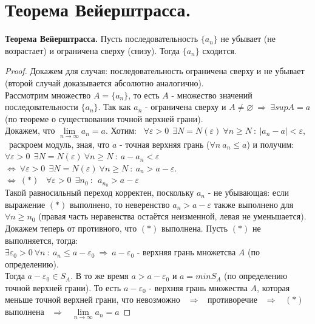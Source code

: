 \documentclass[12pt]{article}
\begin{document}
\section{Теорема Вейерштрасса.}
\textbf{Теорема Вейерштрасса.} Пусть последовательность $\{a_n\}$ не убывает (не возрастает) и ограничена сверху (снизу). Тогда $\{a_n\}$ сходится.
\begin{proof}
    Докажем для случая: последовательность ограничена сверху и не убывает (второй случай доказывается абсолютно аналогично). \\
    Рассмотрим множество $A = \{a_n\}$, то есть $A$ - множество значений последовательности $\{a_n\}$. Так как $a_n$ - ограничена сверху и $A \neq \varnothing \ \Rightarrow \ \exists sup A = a$ (по теореме о существовании точной верхней грани). \\
    Докажем, что $\lim \limits_{n \to \infty} a_n = a$. Хотим: \ 
    $\forall \varepsilon > 0 \ \ \exists N = N(\varepsilon) \ \forall n \geq N\ : \ |a_n - a| < \varepsilon$, \ раскроем модуль, зная, что $a$ - точная верхняя грань ($\forall n \ a_n \leq a$) и получим: \\
    $\forall \varepsilon > 0 \ \ \exists N = N(\varepsilon) \ \forall n \geq N\ : \ a - a_n < \varepsilon$ \  
    $\Leftrightarrow \ \forall \varepsilon > 0 \ \ \exists N = N(\varepsilon) \ \forall n \geq N\ : \ a_n > a - \varepsilon$. \\ 
    $\Leftrightarrow \  (*)$ \ $\forall \varepsilon > 0 \ \ \exists n_0 \ : \ \  a_{n_0} > a - \varepsilon$ \  \\
    Такой равносильный переход корректен, поскольку $a_n$ - не убывающая: если выражение $(*)$ выполнено, то неверенство $a_n > a - \varepsilon$ также выполнено для $\forall n \geq n_0$ (правая часть неравенства остаётся неизменной, левая не уменьшается). \\
    Докажем теперь от противного, что $(*)$ выполнена. Пусть $(*)$ не выполняется, тогда: \\ $\exists \varepsilon_0 > 0 \ \forall n \ : \ a_n \leq a - \varepsilon_0 \ \Rightarrow \ a - \varepsilon_0$ - верхняя грань множетсва $A$ (по определению). \\
    Тогда $a - \varepsilon_0 \in S_A$. В то же время $a > a - \varepsilon_0$ и $a = min S_A$ (по определению точной верхней грани). То есть $a - \varepsilon_0$ - верхняя грань множества $A$, которая меньше точной верхней грани, что невозможно \ $\Rightarrow$ \ противоречие \ $\Rightarrow$ \ $(*)$ выполнена \ $\Rightarrow$ \ $\lim \limits_{n \to \infty} a_n = a$
\end{proof}
\end{document}
